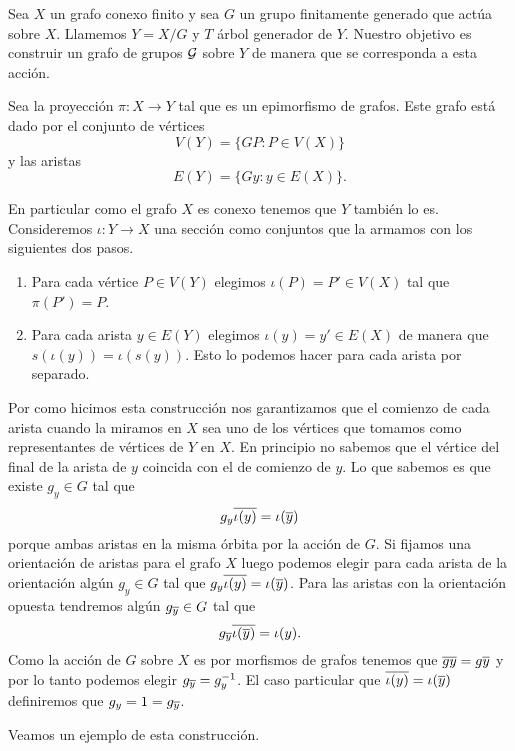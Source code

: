 \documentclass[tesis.tex]{subfiles}
\begin{document}
Sea $X$ un grafo conexo finito y sea $G$ un grupo finitamente generado que actúa sobre $X$.
Llamemos $Y = X / G$ y $T$ árbol generador de $Y$.
Nuestro objetivo es construir un grafo de grupos ${\cal G}$ sobre $Y$ de manera que se corresponda a esta acción.
 
Sea la proyección $\pi: X \to Y$ tal que es un epimorfismo de grafos.
Este grafo está dado por el conjunto de vértices
\[
	V(Y) = \{ G P :  P \in V(X)    \}
\]
y las  aristas 
\[
	E(Y) = \{  Gy  : y \in E(X)  \}.
\]

En particular como el grafo $X$ es conexo tenemos que $Y$ también lo es.
Consideremos $\iota: Y \to X$ una sección como conjuntos que la armamos con los siguientes dos pasos.
\begin{enumerate}
	\item Para cada vértice $P \in V(Y)$ elegimos $\iota (P) = P' \in V(X)$ tal que $\pi(P') = P$.
	\item Para cada arista $y \in E(Y)$ elegimos $\iota(y) = y' \in E(X)$ de manera que $s(\iota(y)) = \iota (s(y))$. 
	Esto lo podemos hacer para cada arista por separado.
\end{enumerate}


Por como hicimos esta construcción nos garantizamos que el comienzo de cada arista cuando la miramos en $X$ sea uno de los vértices que tomamos como representantes de vértices de $Y$ en $X$.
En principio no sabemos que el vértice del final de la arista de $y$ coincida con el de comienzo de $y$. 
Lo que sabemos es que existe $g_y \in G$ tal que 
\[
	g_y \overline{\iota (y)} = \iota (\overline y)
\]
porque ambas aristas en la misma órbita por la acción de $G$.
Si fijamos una orientación de aristas para el grafo $X$ luego podemos elegir para cada arista de la orientación algún $g_y \in G$ tal que $g_y \overline{\iota (y)} = \iota (\overline y)$.
Para las aristas con la orientación opuesta tendremos algún $g_{\overline y} \in G$ tal que 
\[
	g_{\overline y} \overline{\iota(\overline y)} = \iota(y).
\]
Como la acción de $G$ sobre $X$ es por morfismos de grafos tenemos que $\overline {g y} = g \overline y$ y por lo tanto podemos elegir $g_{\overline y} = g_{y}^{-1}$.
El caso particular que $\overline{\iota (y)} = \iota (\overline y)$ definiremos que $g_y = 1 = g_{\overline y}$.

Veamos un ejemplo de esta construcción.
\end{document}

